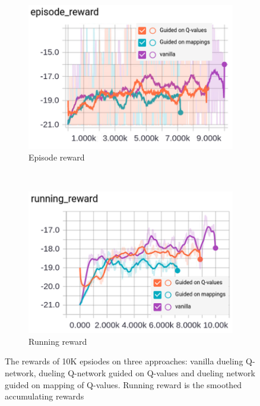 \begin{figure}[h!]
	\centering
	\begin{subfigure}[t]{0.25\textwidth}
		\centering
		\includegraphics[scale=0.35,clip=true,trim = 0mm 0mm 0mm 0mm]{./fig/mimic_result_episode.png}
		\caption{Episode reward}
	\end{subfigure}%
	~ 
	\begin{subfigure}[t]{0.25\textwidth}
		\centering
		\includegraphics[scale=0.35,clip=true,trim = 0mm 0mm 0mm 0mm]{./fig/mimic_result_running.png}
		\caption{Running reward}
	\end{subfigure}
	\vspace{-1mm}
	\caption{The rewards of 10K epsiodes on three approaches: vanilla dueling Q-network, dueling Q-network guided on Q-values and dueling network guided on mapping of Q-values. Running reward is the smoothed accumulating rewards}
\label{fig:mimic_result}
	\vspace{-3mm}
\end{figure}




